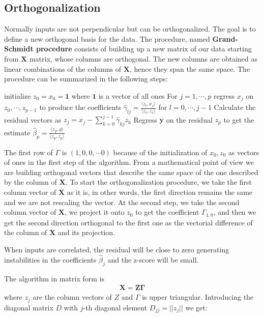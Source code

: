 \documentclass[12pt, letterpaper]{article}
\theoremstyle{definition}
\newcommand{\X}{\mathrm{\mathbf{X}}}
\begin{document}
\subsection{Orthogonalization}
Normally inputs are not perpendicular but can be orthogonalized. The goal is to define a new orthogonal basis for the data. The procedure, named \textbf{Grand-Schmidt procedure} consists of building up a new matrix of our data starting from $\X$ matrix, whose columns are orthogonal. The new columns are obtained as linear combinations of the columns of $\X$, hence they span the same space. The procedure can be summarized in the following steps:
\begin{algorithm}[!ht]
initialize $z_0=x_0=\mathbf{1}$ where $\mathbf{1}$ is a vector of all ones\;
For $j=1,\cdots, p$ regress $x_j$ on $z_0,\cdots, z_{p-1}$ to produce the coefficients $\hat{\gamma}_{lj}= \frac{\langle z_l , x_j\rangle}{\langle z_\ell , z_\ell\rangle}$ for $l=0,\cdots, j-1$\;
Calculate the residual vectors as $z_j = x_j - \sum_{k=0}^{j-1} \hat{\gamma}_{kj}z_k$\;
Regress $\mathbf{y}$ on the residual $z_p$ to get the estimate $\hat{\beta}_p = \frac{\langle z_p, y\rangle}{\langle z_p , z_p\rangle}$
\end{algorithm}
The first row of $\Gamma$ is $(1, 0, 0,\cdots 0)$ because of the initialization of
$x_0, z_0$ as vectors of ones in the first step of the algorithm. From a mathematical point of view we are building orthogonal vectors that describe the same space of the one described by the column of $\X$. To start the orthogonalization procedure, we take the first column vector of $\X$ as it is, in other words, the first direction
remains the same and we are not rescaling the vector. At the second step, we take the second column vector of $\X$, we project it onto $z_0$ to get the coefficient $\Gamma_{1,0}$, and then we get the second direction orthogonal to the first one as the vectorial difference of the column of $\X$ and its projection.

When inputs are correlated, the residual will be close to zero generating instabilities in the coefficients $\hat{\beta}_j$ and the z-score will be small.

The algorithm in matrix form is
\begin{align*}
\mathbf{X = Z\Gamma}
\end{align*}
where $z_j$ are the column vectors of $Z$ and $\Gamma$ is upper triangular. Introducing the diagonal matrix $D$ with $j$-th diagonal element $D_{jj}=||z_j||$ we get:
\end{document}
